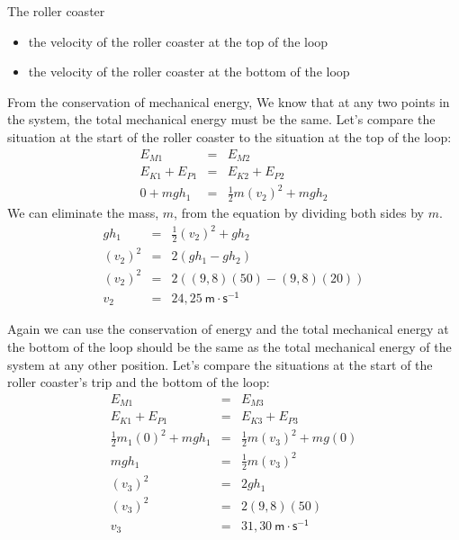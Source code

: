 \begin{wex}{The roller coaster}
{
\begin{itemize}
\item the velocity of the roller coaster at the top of the loop
\item the velocity of the roller coaster at the bottom of the loop
\end{itemize}

From the conservation of mechanical energy, We know that at any two points in the system, the total mechanical energy must be the same. Let's compare the situation at the start of the roller coaster to the situation at the top of the loop:
\begin{eqnarray*}
E_{M1} & = & E_{M2} \\
E_{K1} + E_{P1} & = & E_{K2} + E_{P2} \\
0 + mgh_{1} &=& \frac{1}{2}m(v_{2})^2 + mgh_{2} 
\end{eqnarray*}
We can eliminate the mass, $m$, from the equation by dividing both sides by $m$.
\begin{eqnarray*}
gh_{1} &=&  \frac{1}{2}(v_{2})^2 + gh_{2} \\
(v_{2})^2 &=& 2(gh_{1} - gh_{2}) \\
(v_{2})^2 &=& 2((9,8)(50) - (9,8)(20)) \\
v_{2} &=& 24,25 \ \mathsf{m\cdot s^{-1}}
\end{eqnarray*}

Again we can use the conservation of energy and the total mechanical energy at the bottom of the loop should be the same as the total mechanical energy of the system at any other position. 
Let's compare the situations at the start of the roller coaster's trip and the bottom of the loop:
\begin{eqnarray*}
E_{M1} & = & E_{M3} \\
E_{K1} + E_{P1} & = & E_{K3} + E_{P3} \\
\frac{1}{2}m_{1}(0)^2 + mgh_{1} &=& \frac{1}{2}m(v_{3})^2 + mg(0) \\
mgh_{1} &=&  \frac{1}{2}m(v_{3})^2 \\
(v_3)^2 &=& 2gh_1 \\
(v_3)^2 &=& 2(9,8)(50) \\
v_3 &=& 31,30 \ \mathsf{m \cdot s^{-1}}
\end{eqnarray*}

}
\end{wex}

